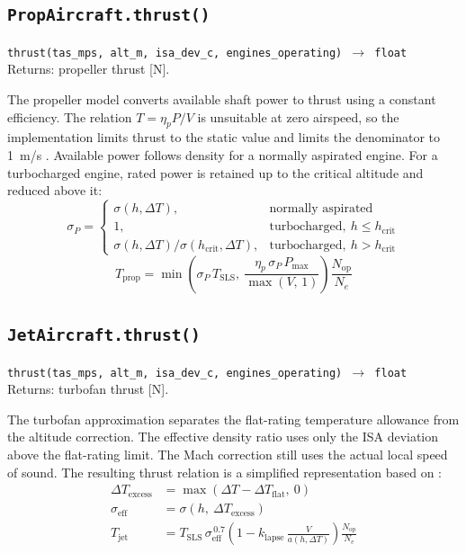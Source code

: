 \documentclass[11pt,letterpaper]{article}
\numberwithin{equation}{section}
\newcommand{\func}[2]{\begin{funcbox}\texttt{#1}\\[2pt]{\color{ink3}Returns:} #2\end{funcbox}}
\newcommand{\code}[1]{\textmd{\texttt{#1}}}
\begin{document}
\subsection{\code{PropAircraft.thrust()}}
\func{thrust(tas\_mps, alt\_m, isa\_dev\_c, engines\_operating) $\rightarrow$ float}{propeller thrust [N].}
The propeller model converts available shaft power to thrust using a constant efficiency. The relation $T=\eta_p P/V$ is unsuitable at zero airspeed, so the implementation limits thrust to the static value and limits the denominator to \SI{1}{m/s} \cite{GUDMUNDSSON,ANDERSON-APD}. Available power follows density for a normally aspirated engine. For a turbocharged engine, rated power is retained up to the critical altitude and reduced above it:
\begin{equation}
\sigma_P =
\begin{cases}
\sigma(h,\Delta T), & \text{normally aspirated}\\
1, & \text{turbocharged},\ h \le h_\text{crit}\\
\sigma(h,\Delta T)/\sigma(h_\text{crit},\Delta T), & \text{turbocharged},\ h > h_\text{crit}
\end{cases} \label{eq:sigma-p}
\end{equation}
\begin{equation}
T_\text{prop} = \min\left(\sigma_P\,T_\text{SLS},\ \frac{\eta_p\,\sigma_P\,P_\text{max}}{\max(V,\,1)}\right)\frac{N_\text{op}}{N_e} \label{eq:T-prop}
\end{equation}

\subsection{\code{JetAircraft.thrust()}}
\func{thrust(tas\_mps, alt\_m, isa\_dev\_c, engines\_operating) $\rightarrow$ float}{turbofan thrust [N].}
The turbofan approximation separates the flat-rating temperature allowance from the altitude correction. The effective density ratio uses only the ISA deviation above the flat-rating limit. The Mach correction still uses the actual local speed of sound. The resulting thrust relation is a simplified representation based on \cite{FILIPPONE}:
\begin{align}
\Delta T_\text{excess} &= \max\left(\Delta T - \Delta T_\text{flat},\ 0\right) \label{eq:jet-excess}\\
\sigma_\text{eff} &= \sigma\!\left(h,\ \Delta T_\text{excess}\right) \label{eq:jet-sigeff}\\
T_\text{jet} &= T_\text{SLS}\,\sigma_\text{eff}^{\,0.7}\left(1 - k_\text{lapse}\,\frac{V}{a(h,\Delta T)}\right)\frac{N_\text{op}}{N_e} \label{eq:T-jet}
\end{align}
\end{document}
